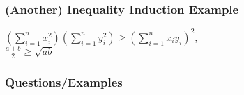 \documentclass{beamer}
\begin{document}
\begin{frame}[t]
  \frametitle{(Another) Inequality Induction Example}
  
  {\tiny \begin{flushright}
    $\left(\sum\limits_{i = 1}^n x_i^2\right)\left(\sum\limits_{i = 1}^n y_i^2\right) \geq \left(\sum\limits_{i = 1}^n x_iy_i\right)^2$, \\
    $\frac{a + b}{2} \geq \sqrt{ab}$
  \end{flushright}}
\end{frame}

\begin{frame}
  \frametitle{Questions/Examples}
  \pause
  \pause
  \pause
\end{frame}
\end{document}
